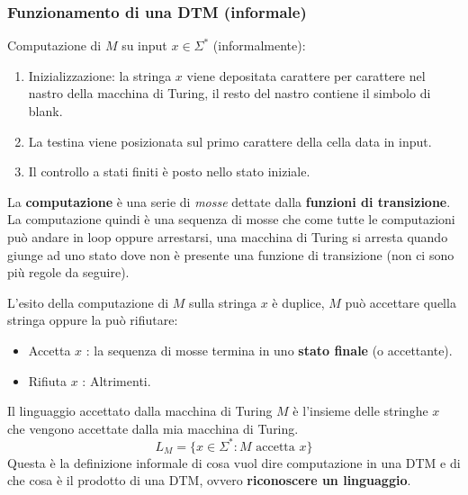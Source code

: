 \documentclass{article}
\begin{document}
\subsubsection{Funzionamento di una DTM (informale)}
Computazione di $M$ su input $x\in\Sigma^*$ (informalmente):
\begin{enumerate}
    \item Inizializzazione: la stringa $x$ viene depositata carattere per carattere nel
    nastro della macchina di Turing, il resto del nastro contiene il simbolo di blank.
    \item La testina viene posizionata sul primo carattere della cella data in input.
    \item Il controllo a stati finiti è posto nello stato iniziale.
\end{enumerate}
La \textbf{computazione} è una serie di \textit{mosse} dettate dalla \textbf{funzioni di transizione}.
La computazione quindi è una sequenza di mosse che come tutte le computazioni può andare
in loop oppure arrestarsi, una macchina di Turing si arresta quando giunge ad uno
stato dove non è presente una funzione di transizione (non ci sono più regole da seguire).

L'esito della computazione di $M$ sulla stringa $x$ è duplice, $M$ può accettare quella
stringa oppure la può rifiutare:
\begin{itemize}
    \item Accetta $x$ : la sequenza di mosse termina in uno \textbf{stato finale} (o accettante).
    \item Rifiuta $x$ : Altrimenti.
\end{itemize}
Il linguaggio accettato dalla macchina di Turing $M$ è l'insieme delle stringhe $x$ che
vengono accettate dalla mia macchina di Turing.
$$L_M=\{x\in\Sigma^*:M\text{ accetta }x\}$$
Questa è la definizione informale di cosa vuol dire computazione in una DTM e di che
cosa è il prodotto di una DTM, ovvero \textbf{riconoscere un linguaggio}.
\end{document}
